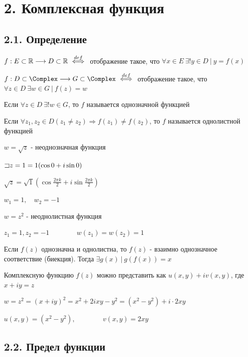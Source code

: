 \documentclass[12pt]{article}
\begin{document}
\section{2. Комплексная функция}

\hypertarget{complex_function}{}

\subsection{2.1. Определение}

\Mem $f : E \subset \mathbb{R} \longrightarrow D \subset \mathbb{R} \ \overset{def}{\Longleftrightarrow} \ $ отображение такое, 
что $\forall x \in E \ \exists! y \in D \ | \ y = f(x)$

\Def $f : D \subset \Complex \longrightarrow G \subset \Complex \ \overset{def}{\Longleftrightarrow} \ $ отображение такое, 
что $\forall z \in D \ \exists w \in G \ | \ f(z) = w$

\Defs Если $\forall z \in D \ \exists! w \in G$, то $f$ называется однозначной функцией

\Defs Если $\forall z_1, z_2 \in D (z_1 \neq z_2) \Longrightarrow f(z_1) \neq f(z_2)$, 
то $f$ называется однолистной функцией

 $w = \sqrt{z}$ - неоднозначная функция

$\mathord{\sqsupset} z = 1 = 1 (\cos 0 + i \sin 0)$

$\sqrt{z} = \sqrt{1} \left(\cos \frac{2\pi k}{2} + i \sin \frac{2\pi k}{2}\right)$

$w_1 = 1, \quad w_2 = -1$

 $w = z^2$ - неоднолистная функция

$z_1 = 1, z_2 = -1 \qquad\qquad w(z_1) = w(z_2) = 1$

\Nota Если $f(z)$ однозначна и однолистна, то $f(z)$ - взаимно однозначное соответствие (биекция). Тогда $\exists g(x) \ | \ g(f(x)) = x$

Комплексную функцию $f(z)$ можно представить как $u(x, y) + i v(x, y)$, где $x + iy = z$

\Ex $w = z^2 = (x + iy)^2 = x^2 + 2ixy - y^2 = (x^2 - y^2) + i \cdot 2xy$

$u(x, y) = (x^2 - y^2), \qquad\qquad v(x, y) = 2xy$

\subsection{2.2. Предел функции}

\hypertarget{complex_limit}{}
\end{document}
